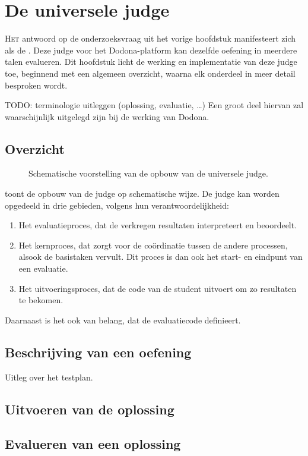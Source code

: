 \chapter{De universele judge}\label{ch:de-universele-judge}

\lettrine{H}{et} antwoord op de onderzoeksvraag uit het vorige hoofdstuk manifesteert zich als de .
Deze judge voor het Dodona-platform kan dezelfde oefening in meerdere talen evalueren.
Dit hoofdstuk licht de werking en implementatie van deze judge toe, beginnend met een algemeen overzicht, waarna elk onderdeel in meer detail besproken wordt.

TODO: terminologie uitleggen (oplossing, evaluatie, \ldots)
Een groot deel hiervan zal waarschijnlijk uitgelegd zijn bij de werking van Dodona.

\section{Overzicht}\label{sec:overzicht}

\begin{figure}
    \begin{adjustbox}{width=\textwidth}
        
    \end{adjustbox}
    \caption{Schematische voorstelling van de opbouw van de universele judge.}
    \label{fig:universal-judge}
\end{figure}

 toont de opbouw van de judge op schematische wijze.
De judge kan worden opgedeeld in drie gebieden, volgens hun verantwoordelijkheid:

\begin{enumerate}
    \item Het evaluatieproces, dat de verkregen resultaten interpreteert en beoordeelt.
    \item Het kernproces, dat zorgt voor de coördinatie tussen de andere processen, alsook de basistaken vervult.
          Dit proces is dan ook het start- en eindpunt van een evaluatie.
    \item Het uitvoeringsproces, dat de code van de student uitvoert om zo resultaten te bekomen.
\end{enumerate}

Daarnaast is het  ook van belang, dat de evaluatiecode definieert.

\section{Beschrijving van een oefening}

Uitleg over het testplan.

\section{Uitvoeren van de oplossing}

\section{Evalueren van een oplossing}

